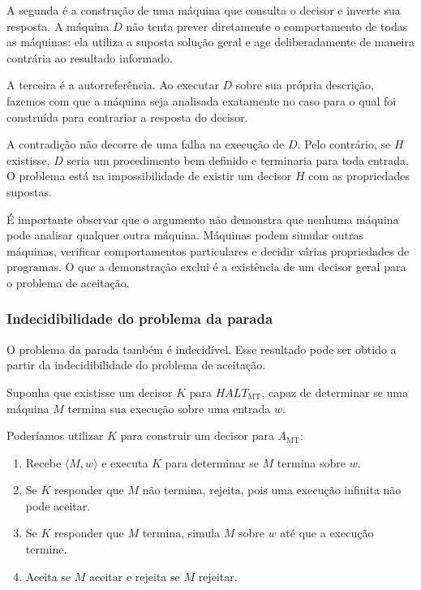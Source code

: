 \documentclass[
  brazilian,
  letterpaper,
]{book}
\providecommand{\tightlist}{%
  \setlength{\itemsep}{0pt}\setlength{\parskip}{0pt}}
\theoremstyle{plain}
\theoremstyle{definition}
\theoremstyle{remark}
\begin{document}
A segunda é a construção de uma máquina que consulta o decisor e inverte
sua resposta. A máquina \(D\) não tenta prever diretamente o
comportamento de todas as máquinas: ela utiliza a suposta solução geral
e age deliberadamente de maneira contrária ao resultado informado.

A terceira é a autorreferência. Ao executar \(D\) sobre sua própria
descrição, fazemos com que a máquina seja analisada exatamente no caso
para o qual foi construída para contrariar a resposta do decisor.

A contradição não decorre de uma falha na execução de \(D\). Pelo
contrário, se \(H\) existisse, \(D\) seria um procedimento bem definido
e terminaria para toda entrada. O problema está na impossibilidade de
existir um decisor \(H\) com as propriedades supostas.

É importante observar que o argumento não demonstra que nenhuma máquina
pode analisar qualquer outra máquina. Máquinas podem simular outras
máquinas, verificar comportamentos particulares e decidir várias
propriedades de programas. O que a demonstração exclui é a existência de
um decisor geral para o problema de aceitação.

\subsubsection{Indecidibilidade do problema da
parada}\label{indecidibilidade-do-problema-da-parada}

O problema da parada também é indecidível. Esse resultado pode ser
obtido a partir da indecidibilidade do problema de aceitação.

Suponha que existisse um decisor \(K\) para \(HALT_{\mathrm{MT}}\),
capaz de determinar se uma máquina \(M\) termina sua execução sobre uma
entrada \(w\).

Poderíamos utilizar \(K\) para construir um decisor para
\(A_{\mathrm{MT}}\):

\begin{enumerate}
\def\labelenumi{\arabic{enumi}.}
\tightlist
\item
  Recebe \(\langle M,w\rangle\) e executa \(K\) para determinar se \(M\)
  termina sobre \(w\).
\item
  Se \(K\) responder que \(M\) não termina, rejeita, pois uma execução
  infinita não pode aceitar.
\item
  Se \(K\) responder que \(M\) termina, simula \(M\) sobre \(w\) até que
  a execução termine.
\item
  Aceita se \(M\) aceitar e rejeita se \(M\) rejeitar.
\end{enumerate}
\end{document}
